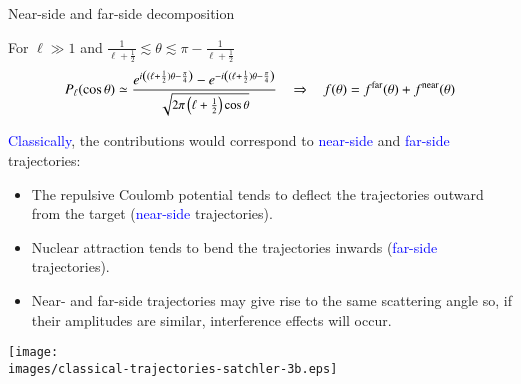 \documentclass[english,10pt]{beamer}
\newcommand{\bi}{\begin{itemize}}
\newcommand{\ei}{\end{itemize}}
\newcommand{\images}{images}
\begin{document}
\begin{frame}[fragile]{Near-side and far-side decomposition}

 For $\ell \gg 1$ and  $\frac{1}{\ell +\frac{1}{2}} \lesssim \theta \lesssim  \pi -\frac{1}{\ell +\frac{1}{2}}$
$$
\small
P_{\ell}(\cos\theta) \simeq  \frac{e^{i\left((\ell+\frac{1}{2})\theta -\frac{\pi}{4}\right)}-
e^{-i\left((\ell+\frac{1}{2})\theta -\frac{\pi}{4}\right)}}
{{\sqrt{2\pi\left(\ell+\frac{1}{2}\right)\cos\theta}}}
\quad
\Rightarrow
\quad 
f(\theta) = f^\mathrm{far}(\theta) + f^\mathrm{near}(\theta)
$$

\textcolor{blue}{Classically}, the contributions would correspond to  \textcolor{blue}{near-side} and \textcolor{blue}{far-side} trajectories:
\bi
\footnotesize
\item[\ding{233}] The repulsive Coulomb potential tends to deflect the trajectories outward from the target (\textcolor{blue}{near-side} trajectories). 
\item[\ding{233}] Nuclear attraction tends to bend the trajectories inwards (\textcolor{blue}{far-side} trajectories).
\item[\ding{233}] Near- and far-side trajectories may give rise to the same scattering angle so, if their amplitudes are similar, interference effects will occur. 
\ei

\begin{center}
 \texttt{[image: \\images/classical-trajectories-satchler-3b.eps]}
\end{center}


\begin{comment}
\begin{columns}
\column{0.5\textwidth}
\begin{center}
    \texttt{[image: \\images/classical-trajectories-satchler-3b.eps]}
\end{center}
\column{0.5\textwidth}
\begin{center}
    \texttt{[image: \\images/he4pb\_deflect\_3b.eps]}
\end{center}
\end{columns}
\end{comment}


\end{frame}
\end{document}
